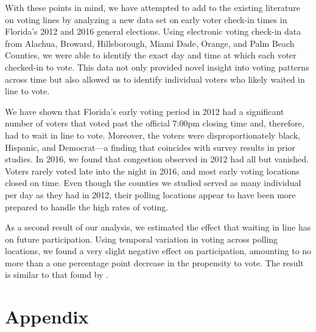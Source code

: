\documentclass[12pt,titlepage]{article}
\begin{document}
With these points in mind, we have attempted to add to the existing
literature on voting lines by analyzing a new data set on early voter
check-in times in Florida's 2012 and 2016 general elections. Using
electronic voting check-in data from Alachua, Broward, Hillsborough,
Miami Dade, Orange, and Palm Beach Counties, we were able to identify
the exact day and time at which each voter checked-in to vote.  This
data not only provided novel insight into voting patterns across time
but also allowed us to identify individual voters who likely waited in
line to vote.

We have shown that Florida's early voting period in 2012 had a
significant number of voters that voted past the official 7:00pm
closing time and, therefore, had to wait in line to vote.  Moreover,
the voters were disproportionately black, Hispanic, and Democrat---a
finding that coincides with survey results in prior studies.  In 2016,
we found that congestion observed in 2012 had all but vanished.
Voters rarely voted late into the night in 2016, and most early voting
locations closed on time.  Even though the counties we studied served
as many individual per day as they had in 2012, their polling
locations appear to have been more prepared to handle the high rates
of voting.
  
As a second result of our analysis, we estimated the effect that
waiting in line has on future participation.  Using temporal variation
in voting across polling locations, we found a very slight negative
effect on participation, amounting to no more than a one percentage
point decrease in the propensity to vote. The result is similar to
that found by \citet{pettigrew:racegapwaittimes}.

% 

\clearpage
\newpage





\newpage
\appendix
\section*{Appendix}

 
\end{document}
